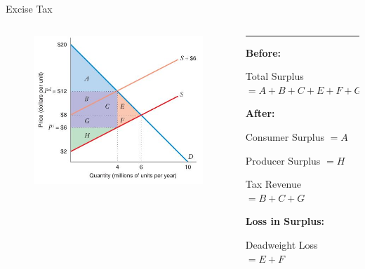 \documentclass[11pt,t]{beamer}
\begin{document}
\begin{frame}{Excise Tax}
  \begin{columns}[T]
    \vspace{0pt}
    \begin{column}{.6\textwidth}
      \begin{figure}
        \includegraphics[width=\textwidth]{figures/fig10_3a.jpg}
      \end{figure}

      \vspace*{50mm} %
    \end{column}
    
    \hfill
    
    \begin{column}{.4\textwidth}
      {\color{accent}\rule{\linewidth}{2pt}}

      \textbf{Before:} 
      
      Total Surplus $= A + B + C + E + F + G + H$
      
      \bigskip
      \textbf{After:}

      Consumer Surplus $= A$
      
      Producer Surplus $= H$
      
      Tax Revenue $= B + C + G$
      
      \bigskip
      \textbf{Loss in Surplus:}

      Deadweight Loss $= E + F$
    \end{column}
  \end{columns}
\end{frame}
\end{document}
